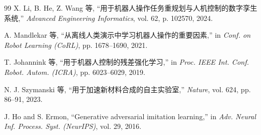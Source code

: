 \documentclass[journal,twocolumn]{IEEEtran}
\begin{document}
\begin{thebibliography}{99}
X. Li, B. He, Z. Wang 等, ``用于机器人操作任务重规划与人机控制的数字孪生系统,'' \textit{Advanced Engineering Informatics}, vol. 62, p. 102570, 2024.

A. Mandlekar 等, ``从离线人类演示中学习机器人操作的重要因素,'' in \textit{Conf. on Robot Learning (CoRL)}, pp. 1678--1690, 2021.

T. Johannink 等, ``用于机器人控制的残差强化学习,'' in \textit{Proc. IEEE Int. Conf. Robot. Autom. (ICRA)}, pp. 6023--6029, 2019.

N. J. Szymanski 等, ``用于加速新材料合成的自主实验室,'' \textit{Nature}, vol. 624, pp. 86--91, 2023.

J. Ho and S. Ermon, ``Generative adversarial imitation learning,'' in \textit{Adv. Neural Inf. Process. Syst. (NeurIPS)}, vol. 29, 2016.

\end{thebibliography}
\end{document}
